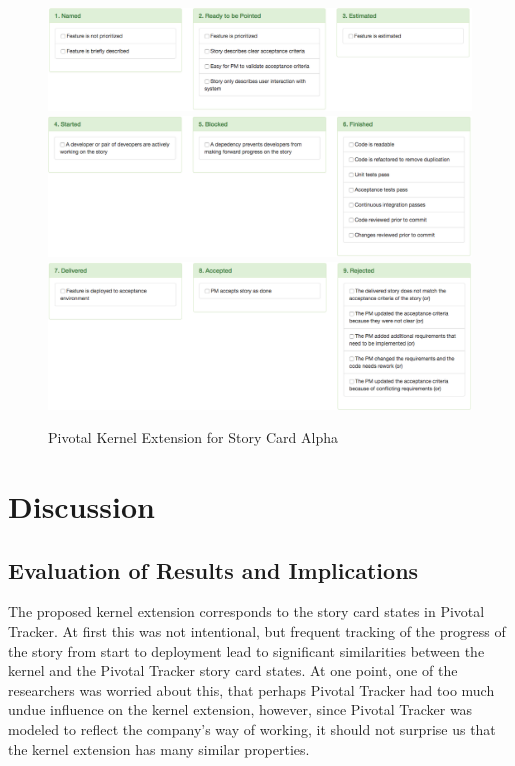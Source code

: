 \documentclass[preprint,12pt,3p]{elsarticle}
\begin{document}
\begin{figure}[ht]
\includegraphics[width=6.25in]{pivotal_images/story_card_descriptive1}
\includegraphics[width=6.25in]{pivotal_images/story_card_descriptive2}
\includegraphics[width=6.25in]{pivotal_images/story_card_descriptive3}
\caption{Pivotal Kernel Extension for Story Card Alpha}
\label{KernelExtensionDescriptive}
\end{figure}
\section{Discussion}

\subsection{Evaluation of Results and Implications}

The proposed kernel extension corresponds to the story card states in Pivotal Tracker. At first this was not intentional, but frequent tracking of the progress of the story from start to deployment lead to significant similarities between the kernel and the Pivotal Tracker story card states. At one point, one of the researchers was worried about this, that perhaps Pivotal Tracker had too much undue influence on the kernel extension, however, since Pivotal Tracker was modeled to reflect the company's way of working, it should not surprise us that the kernel extension has many similar properties. 
\end{document}
